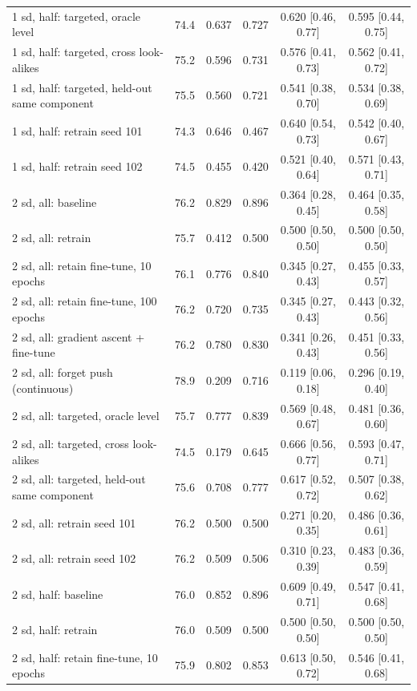 \begin{tabular}{lccccc}
1 sd, half: targeted, oracle level & 74.4 & 0.637 & 0.727 & 0.620 [0.46, 0.77] & 0.595 [0.44, 0.75] \\
1 sd, half: targeted, cross look-alikes & 75.2 & 0.596 & 0.731 & 0.576 [0.41, 0.73] & 0.562 [0.41, 0.72] \\
1 sd, half: targeted, held-out same component & 75.5 & 0.560 & 0.721 & 0.541 [0.38, 0.70] & 0.534 [0.38, 0.69] \\
1 sd, half: retrain seed 101 & 74.3 & 0.646 & 0.467 & 0.640 [0.54, 0.73] & 0.542 [0.40, 0.67] \\
1 sd, half: retrain seed 102 & 74.5 & 0.455 & 0.420 & 0.521 [0.40, 0.64] & 0.571 [0.43, 0.71] \\
\midrule
2 sd, all: baseline & 76.2 & 0.829 & 0.896 & 0.364 [0.28, 0.45] & 0.464 [0.35, 0.58] \\
2 sd, all: retrain & 75.7 & 0.412 & 0.500 & 0.500 [0.50, 0.50] & 0.500 [0.50, 0.50] \\
2 sd, all: retain fine-tune, 10 epochs & 76.1 & 0.776 & 0.840 & 0.345 [0.27, 0.43] & 0.455 [0.33, 0.57] \\
2 sd, all: retain fine-tune, 100 epochs & 76.2 & 0.720 & 0.735 & 0.345 [0.27, 0.43] & 0.443 [0.32, 0.56] \\
2 sd, all: gradient ascent + fine-tune & 76.2 & 0.780 & 0.830 & 0.341 [0.26, 0.43] & 0.451 [0.33, 0.56] \\
2 sd, all: forget push (continuous) & 78.9 & 0.209 & 0.716 & 0.119 [0.06, 0.18] & 0.296 [0.19, 0.40] \\
2 sd, all: targeted, oracle level & 75.7 & 0.777 & 0.839 & 0.569 [0.48, 0.67] & 0.481 [0.36, 0.60] \\
2 sd, all: targeted, cross look-alikes & 74.5 & 0.179 & 0.645 & 0.666 [0.56, 0.77] & 0.593 [0.47, 0.71] \\
2 sd, all: targeted, held-out same component & 75.6 & 0.708 & 0.777 & 0.617 [0.52, 0.72] & 0.507 [0.38, 0.62] \\
2 sd, all: retrain seed 101 & 76.2 & 0.500 & 0.500 & 0.271 [0.20, 0.35] & 0.486 [0.36, 0.61] \\
2 sd, all: retrain seed 102 & 76.2 & 0.509 & 0.506 & 0.310 [0.23, 0.39] & 0.483 [0.36, 0.59] \\
\midrule
2 sd, half: baseline & 76.0 & 0.852 & 0.896 & 0.609 [0.49, 0.71] & 0.547 [0.41, 0.68] \\
2 sd, half: retrain & 76.0 & 0.509 & 0.500 & 0.500 [0.50, 0.50] & 0.500 [0.50, 0.50] \\
2 sd, half: retain fine-tune, 10 epochs & 75.9 & 0.802 & 0.853 & 0.613 [0.50, 0.72] & 0.546 [0.41, 0.68] \\

\end{tabular}
